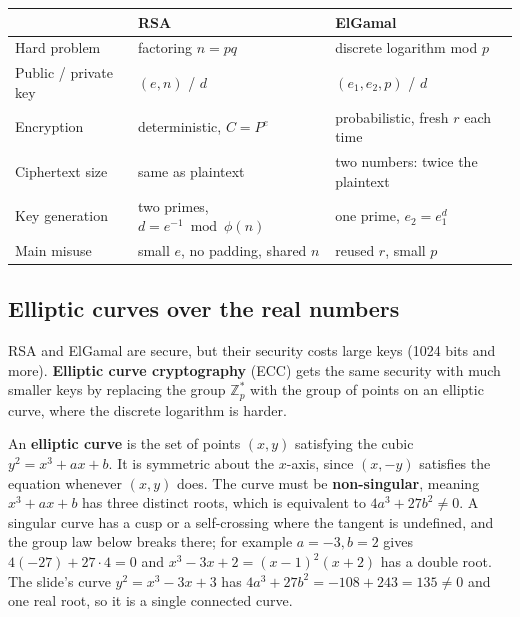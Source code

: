 \begin{center}\small
\begin{tabular}{@{}lll@{}}
\toprule
 & RSA & ElGamal\\
\midrule
Hard problem & factoring $n = pq$ & discrete logarithm mod $p$\\
Public / private key & $(e, n)$ / $d$ & $(e_1, e_2, p)$ / $d$\\
Encryption & deterministic, $C = P^e$ & probabilistic, fresh $r$ each time\\
Ciphertext size & same as plaintext & two numbers: twice the plaintext\\
Key generation & two primes, $d = e^{-1} \bmod \phi(n)$ & one prime, $e_2 = e_1^d$\\
Main misuse & small $e$, no padding, shared $n$ & reused $r$, small $p$\\
\bottomrule
\end{tabular}
\end{center}

\subsection{Elliptic curves over the real numbers}
RSA and ElGamal are secure, but their security costs large keys (1024 bits and more). \textbf{Elliptic curve cryptography} (ECC) gets the same security with much smaller keys by replacing the group $\mathbb{Z}_p^*$ with the group of points on an elliptic curve, where the discrete logarithm is harder.

An \textbf{elliptic curve} is the set of points $(x, y)$ satisfying the cubic $y^2 = x^3 + ax + b$. It is symmetric about the $x$-axis, since $(x, -y)$ satisfies the equation whenever $(x, y)$ does. The curve must be \textbf{non-singular}, meaning $x^3 + ax + b$ has three distinct roots, which is equivalent to $4a^3 + 27b^2 \ne 0$. A singular curve has a cusp or a self-crossing where the tangent is undefined, and the group law below breaks there; for example $a = -3, b = 2$ gives $4(-27) + 27 \cdot 4 = 0$ and $x^3 - 3x + 2 = (x - 1)^2(x + 2)$ has a double root. The slide's curve $y^2 = x^3 - 3x + 3$ has $4a^3 + 27b^2 = -108 + 243 = 135 \ne 0$ and one real root, so it is a single connected curve.

